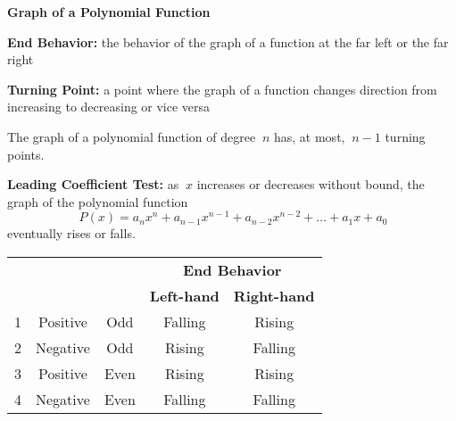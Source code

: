 \begin{center}
\textbf{Graph of a Polynomial Function}
\end{center}

\vspace*{1ex}

\textbf{End Behavior:} the behavior of the graph of a function at the far left or the far right 

\vspce 

\textbf{Turning Point:} a point where the graph of a function changes direction from increasing to decreasing or vice versa 

\vspce 

The graph of a polynomial function of degree $\ {n }$ has, at most, $\ {n-1 }$ turning points. 

\vspce 

\textbf{Leading Coefficient Test:} as $\ {x }$ increases or decreases without bound, the graph of the polynomial function \[\ { P(x) =a_nx^n+a_{n-1}x^{n-1}+a_{n-2}x^{n-2}+\ldots +a_1x+a_0}\] eventually rises or falls. 

\vspce 

\noindent\begin{tabular}{|*{5}{c|}}
\hline
\multirow{2}{2.5em}{\centering{\textbf{Case}}} & \multirow{2}{6em}{\centering{\textbf{Leading Coefficient}}}  & \multirow{2}{4em}{\centering{\textbf{Degree}}}  & \multicolumn{2}{|c|}{\textbf{End Behavior}} \\
\cline{4-5} 
 &  & & \textbf{Left-hand} & \textbf{Right-hand}\\
\hline 
1 & Positive & Odd & Falling & Rising \\
\hline 
2 & Negative  & Odd & Rising & Falling \\
\hline 
3 & Positive & Even & Rising & Rising \\
\hline 
4 & Negative & Even & Falling & Falling \\
\hline 
\end{tabular} 

\vspce 

